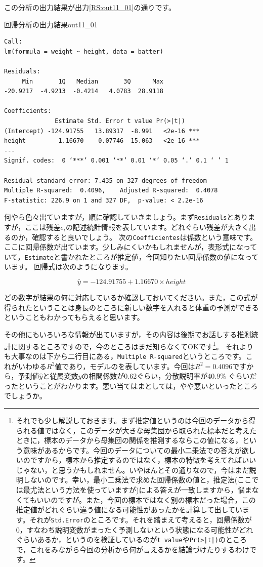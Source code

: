 \documentclass{ltjbook}
\begin{document}
この分析の出力結果が出力\ref{RS:out11_01}の通りです。

\begin{Rscreen}{回帰分析の出力結果}{out11_01}
	\begin{verbatim}
Call:
lm(formula = weight ~ height, data = batter)

Residuals:
     Min       1Q   Median       3Q      Max 
-20.9217  -4.9213  -0.4214   4.0783  28.9118 

Coefficients:
              Estimate Std. Error t value Pr(>|t|)    
(Intercept) -124.91755   13.89317  -8.991   <2e-16 ***
height         1.16670    0.07746  15.063   <2e-16 ***
---
Signif. codes:  0 ‘***’ 0.001 ‘**’ 0.01 ‘*’ 0.05 ‘.’ 0.1 ‘ ’ 1

Residual standard error: 7.435 on 327 degrees of freedom
Multiple R-squared:  0.4096,	Adjusted R-squared:  0.4078 
F-statistic: 226.9 on 1 and 327 DF,  p-value: < 2.2e-16
    \end{verbatim}
\end{Rscreen}

何やら色々出ていますが，順に確認していきましょう。まず\texttt{Residuals}とありますが，ここは残差$e_i$の記述統計情報を表しています。どれぐらい残差が大きく出るのか，確認すると良いでしょう。
次の\texttt{Coefficientes}は係数という意味です。ここに回帰係数が出ています。少しみにくいかもしれませんが，表形式になっていて，\texttt{Estimate}と書かれたところが推定値，今回知りたい回帰係数の値になっています。
回帰式は次のようになります。

\[ \hat{y} = -124.91755 + 1.16670 \times height \]

どの数字が結果の何に対応しているか確認しておいてください。また，この式が得られたということは身長のところに新しい数字を入れると体重の予測ができるということもわかってもらえると思います。

その他にもいろいろな情報が出ていますが，その内容は後期でお話しする推測統計に関するところですので，今のところはまだ知らなくてOKです\footnote{それでも少し解説しておきます。まず推定値というのは今回のデータから得られる値ではなく，このデータが大きな母集団から取られた標本だと考えたときに，標本のデータから母集団の関係を推測するならこの値になる，という意味があるからです。今回のデータについての最小二乗法での答えが欲しいのですから，標本から推定するのではなく，標本の特徴を考えてればいいじゃない，と思うかもしれません。いやほんとその通りなので，今はまだ説明しないのです。幸い，最小二乗法で求めた回帰係数の値と，推定法(ここでは最尤法という方法を使っていますが)による答えが一致しますから，悩まなくてもいいのですが。また，今回の標本ではなく別の標本だった場合，この推定値がどれぐらい違う値になる可能性があったかを計算して出しています。それが\texttt{Std.Error}のところです。それを踏まえて考えると，回帰係数が0，すなわち説明変数がまったく予測しないという状態になる可能性がどれぐらいあるか，というのを検証しているのが\texttt{t value}や\texttt{Pr(>|t|)}のところで，これをみながら今回の分析から何が言えるかを結論づけたりするわけです。}。
それよりも大事なのは下から二行目にある，\texttt{Multiple R-squared}というところです。これがいわゆる$R^2$値であり，モデルのを表しています。今回は$R^2=0.4096$ですから，予測値$\hat{y}$と従属変数$y$の相関係数が0.62ぐらい，分散説明率が40.9\% ぐらいだったということがわかります。悪い当てはまとしては，やや悪いといったところでしょうか。
\end{document}
